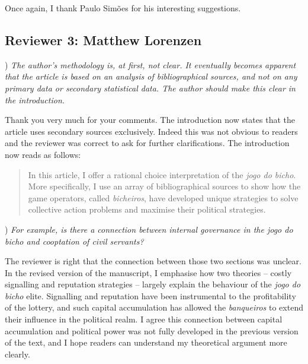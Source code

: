 \documentclass[a4paper,12pt]{article}
\begin{document}
\vspace{.5cm}

Once again, I thank Paulo Simões for his interesting suggestions.

\newpage

\subsection*{Reviewer 3: Matthew Lorenzen}%
\label{sub:reviewer_3_matthew_lorenzen}

) \textit{The author's methodology is, at first, not clear. It eventually becomes apparent that the article is based on an analysis of bibliographical sources, and not on any primary data or secondary statistical data. The author should make this clear in the introduction.}

\vspace{.25cm}

Thank you very much for your comments. The introduction now states that the article uses secondary sources exclusively. Indeed this was not obvious to readers and the reviewer was correct to ask for further clarifications. The introduction now reads as follows:

\begin{quote}
	In this article, I offer a rational choice interpretation of the \emph{jogo do bicho}. More specifically, I use an array of bibliographical sources to show how the game operators, called \emph{bicheiros}, have developed unique strategies to solve collective action problems and maximise their political strategies.
\end{quote}

\vspace{.5cm}

) \textit{For example, is there a connection between internal governance in the jogo do bicho and cooptation of civil servants?}

\vspace{.25cm}

The reviewer is right that the connection between those two sections was unclear. In the revised version of the manuscript, I emphasise how two theories -- costly signalling and reputation strategies -- largely explain the behaviour of the \textit{jogo do bicho} elite. Signalling and reputation have been instrumental to the profitability of the lottery, and such capital accumulation has allowed the \textit{banqueiros} to extend their influence in the political realm. I agree this connection between capital accumulation and political power was not fully developed in the previous version of the text, and I hope readers can understand my theoretical argument more clearly. 
\end{document}
